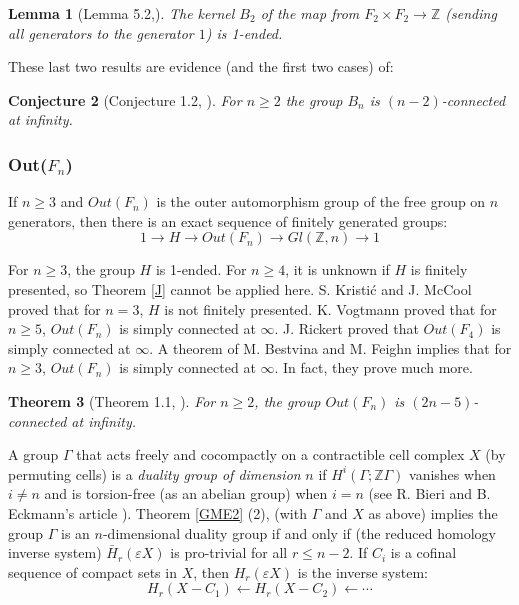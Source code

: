 \documentclass[12pt]{article}
\newtheorem{theorem}{Theorem}[subsection]
\newtheorem{lemma}[theorem]{Lemma}
\newtheorem{conjecture}[theorem]{Conjecture}
\begin{document}
\begin{lemma}  [Lemma 5.2,\cite{MM24}]  \label{OneE} The kernel $B_2$ of the map from $F_2\times F_2\to \mathbb Z$ (sending all generators to the generator $1$) is 1-ended. 
\end{lemma}
These last two results are evidence (and the first two cases) of:

\begin{conjecture}[Conjecture 1.2, \cite{MM24}] For $n\geq 2$ the group $B_n$ is $(n-2)$-connected at infinity.
\end{conjecture}

\subsubsection{Out($F_n$)} \label{OUT} 
If $n\geq 3$ and $Out(F_n)$ is the outer automorphism group of the free group on $n$ generators, then there is an exact sequence of finitely generated groups:
$$1\to H\to Out (F_n)\to Gl(\mathbb Z,n)\to 1$$


 For $n\geq 3$, the group $H$ is 1-ended. For $n\geq 4$, it is unknown if $H$ is finitely presented, so Theorem \ref{J} cannot be applied here. S. Kristi\'c and J. McCool \cite{kMc97} proved that for $n=3$, $H$ is not finitely presented. K. Vogtmann \cite{Vo95} proved that for $n\geq 5$, $Out(F_n)$ is simply connected at $\infty$. 
J. Rickert \cite{Ric00} proved that $Out(F_4)$ is simply connected at $\infty$. A theorem of M. Bestvina and M. Feighn implies that for $n\geq 3$, $Out(F_n)$ is simply connected at $\infty$. In fact, they prove much more.

\begin{theorem} 
[Theorem 1.1, \cite{BFe00}] \label{BF1}  For $n\geq 2$, the group $Out(F_n)$ is $(2n-5)$-connected at infinity.
\end{theorem}

A group $\Gamma$ that acts freely and cocompactly on a contractible cell complex
$X$ (by permuting cells) is a {\it duality group of dimension} $n$ if $H^i (\Gamma; \mathbb Z \Gamma)$ vanishes when $i\ne n$ and is torsion-free (as an abelian group) when $i = n$ (see R. Bieri and B. Eckmann's article \cite{BE73}). Theorem \ref{GME2} (2), (with $\Gamma$ and $X$ as above) implies the group $\Gamma$ is an $n$-dimensional duality group if and only if  (the reduced homology inverse system) $\bar H_r(\varepsilon X)$ is pro-trivial for all $r\leq n-2$. If $C_i$ is a cofinal sequence of compact sets in $X$, then $H_r(\varepsilon X)$ is the inverse system:
$$H_r(X-C_1)\leftarrow H_r(X-C_2) \leftarrow\cdots$$
\end{document}
